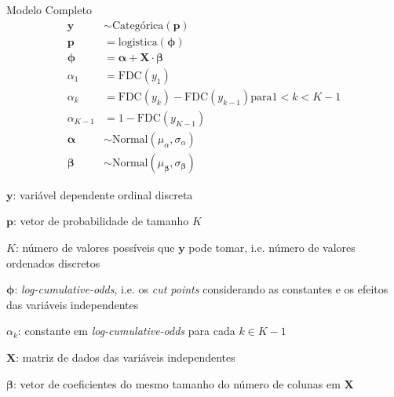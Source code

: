 \begin{frame}{Modelo Completo}
	\footnotesize
	$$
		\begin{aligned}
			\mathbf{y}          & \sim \text{Categórica}(\mathbf{p})                                        \\
			\mathbf{p}          & = \mathrm{logistica}(\boldsymbol{\phi})                                   \\
			\boldsymbol{\phi}   & = \boldsymbol{\alpha} + \mathbf{X} \cdot \boldsymbol{\beta}               \\
			\alpha_1            & = \mathrm{FDC}(y_1)                                                       \\
			\alpha_k            & = \mathrm{FDC}(y_k) - \mathrm{FDC}(y_{k-1}) \mathrm{ para } 1 < k < K-1   \\
			\alpha_{K-1}        & = 1 - \mathrm{FDC}(y_{K-1})                                               \\
			\boldsymbol{\alpha} & \sim \text{Normal}(\mu_\alpha, \sigma_\alpha)                             \\
			\boldsymbol{\beta}  & \sim \text{Normal}(\mu_{\boldsymbol{\beta}}, \sigma_{\boldsymbol{\beta}})
		\end{aligned}
	$$
	\begin{vfilleditems}
		\item \footnotesize  $\mathbf{y}$: variável dependente ordinal discreta
		\item \footnotesize  $\mathbf{p}$: vetor de probabilidade de tamanho $K$
		\item \footnotesize  $K$: número de valores possíveis que $\mathbf{y}$ pode tomar, i.e. número de valores ordenados discretos
		\item \footnotesize  $\boldsymbol{\phi}$: \textit{log-cumulative-odds}, i.e. os \textit{cut points} considerando as constantes e os efeitos das variáveis independentes
		\item \footnotesize  $\alpha_k$: constante em \textit{log-cumulative-odds} para cada $k \in K-1$
		\item \footnotesize  $\mathbf{X}$: matriz de dados das variáveis independentes
		\item \footnotesize  $\boldsymbol{\beta}$: vetor de coeficientes do mesmo tamanho do número de colunas em $\mathbf{X}$
	\end{vfilleditems}
\end{frame}

